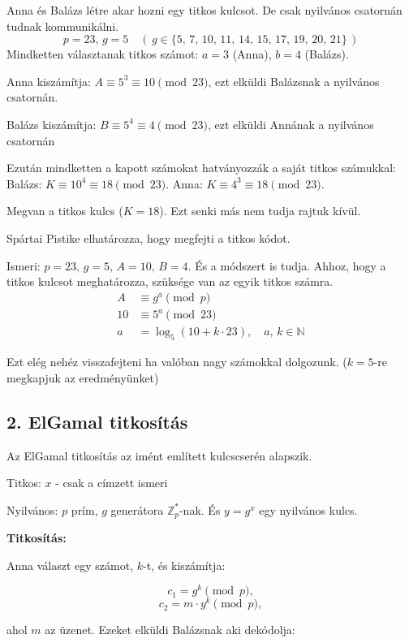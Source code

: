 \begin{example}
Anna és Balázs létre akar hozni egy titkos kulcsot.
De csak nyilvános csatornán tudnak kommunikálni. 
\[
p=23,\,g=5\quad(\,g\in\{5,\,7,\,10,\,11,\,14,\,15,\,17,\,19,\,20,\,21\}\,)
\]
Mindketten választanak titkos számot: $a=3$ (Anna), $b=4$ (Balázs).

Anna kiszámítja: $A\equiv5^{3}\equiv10\pmod{23}$, ezt elküldi Balázsnak
a nyilvános csatornán.

Balázs kiszámítja: $B\equiv5^{4}\equiv4\pmod{23}$, ezt elküldi Annának
a nyilvános csatornán

Ezután mindketten a kapott számokat hatványozzák a saját titkos számukkal:
Balázs: $K\equiv10^{4}\equiv18\pmod{23}$. Anna: $K\equiv4^{3}\equiv18\pmod{23}$.

Megvan a titkos kulcs ($K=18$). Ezt senki más nem tudja rajtuk kívül.

Spártai Pistike elhatározza, hogy megfejti a titkos kódot.

Ismeri: $p=23,\,g=5,\,A=10,\,B=4$. És a módszert is tudja. Ahhoz,
hogy a titkos kulcsot meghatározza, szüksége van az egyik titkos számra.
\begin{align*}
A & \equiv g^{a}\pmod p\\
10 & \equiv5^{a}\pmod{23}\\
a & =\log_{5}(10+k\cdot23),\quad a,\,k\in\mathbb{N}
\end{align*}

Ezt elég nehéz visszafejteni ha valóban nagy számokkal dolgozunk.
($k=5$-re megkapjuk az eredményünket)
\end{example}

\subsection*{2. ElGamal titkosítás}

Az ElGamal titkosítás az imént említett kulcscserén alapszik.

Titkos: $x$ - csak a címzett ismeri

Nyilvános: $p$ prím, $g$ generátora $\mathbb{Z}_{p}^{*}$-nak. És
$y=g^{x}$ egy nyilvános kulcs.

\textbf{Titkosítás:}

Anna választ egy számot, $k$-t, és kiszámítja:

\[
c_{1}=g^{k}\pmod p,
\]
\[
c_{2}=m\cdot y^{k}\pmod p,
\]

ahol $m$ az üzenet. Ezeket elküldi Balázsnak aki dekódolja:

